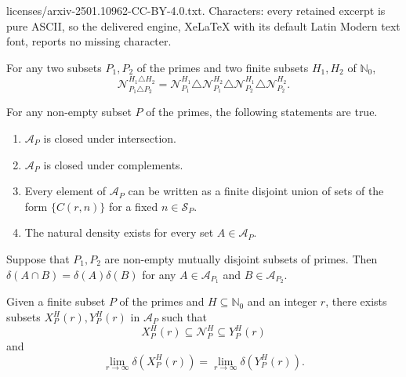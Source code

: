 \documentclass[10pt,a4paper]{amsart}
\newcommand{\N}{\mathbb{N}}
\begin{document}
licenses/arxiv-2501.10962-CC-BY-4.0.txt. Characters: every retained excerpt is pure ASCII, so the delivered engine, XeLaTeX with its default Latin Modern text font, reports no missing character.
	\begin{lemma}\label{Lemma "N_p recursion"}
		For any two subsets $ P_1, P_2 $ of the primes and two finite subsets $H_1,H_2$ of $\N_0$,
		\[
		\mathcal{N}_{P_1\triangle P_2}^{H_1\triangle H_2} = \mathcal{N}_{P_1}^{H_1} \triangle \mathcal{N}_{P_1}^{H_2} \triangle \mathcal{N}_{P_2}^{H_1} \triangle \mathcal{N}_{P_2}^{H_2}.
		\]
	\end{lemma}

	\begin{lemma}\label{Lemma "Properties of AP"}
		For any non-empty subset $P$ of the primes, the following statements are true.
		\begin{enumerate}
			\item	$\mathcal{A}_P$ is closed under intersection.
			\item 	$\mathcal{A}_P$ is closed under complements.
			\item 	Every element of $\mathcal{A}_P$ can be written as a finite disjoint union of sets of the form $\{C(r,n)\}$ for a fixed $n\in \mathcal{S}_P$.
			\item 	The natural density exists for every set $A\in \mathcal{A}_P$.
		\end{enumerate}
	\end{lemma}

	\begin{proposition}\label{Proposition "Multiplicative AP"}
		 Suppose that $P_1, P_2$ are non-empty mutually disjoint subsets of primes. Then $\delta(A\cap B) = \delta(A)\delta(B)$ for any $A\in \mathcal{A}_{P_1}$ and $B\in \mathcal{A}_{P_2}$.
	\end{proposition}

	 \begin{proposition}\label{Proposition "Approximation"}
	 	Given a finite subset $P$ of the primes and $H\subseteq \N_0$ and an integer $r$, there exists subsets $X_P^H(r), Y_P^H(r)$ in $\mathcal{A}_P$ such that 
	 	\[
	 	X_P^H(r)\subseteq \mathcal{N}_P^H\subseteq Y_P^H(r)
	 	\]
	 	and 
	 	\[
	 	\lim_{r\to\infty} \delta(X_P^H(r)) = \lim_{r\to\infty} \delta(Y_P^H(r)).
	 	\]
	 \end{proposition}
\end{document}
